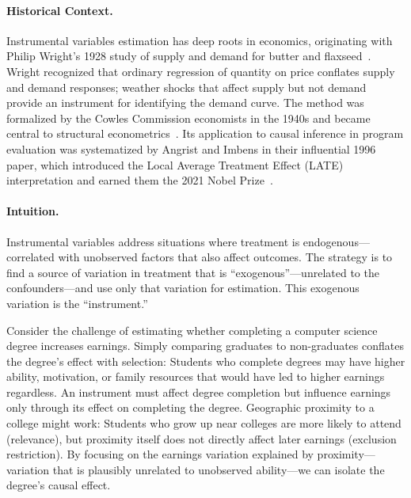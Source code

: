 \paragraph{Historical Context.}
Instrumental variables estimation has deep roots in economics, originating with Philip Wright's 1928 study of supply and demand for butter and flaxseed~\cite{wright1928tariff, stock2003retrospectives}.
Wright recognized that ordinary regression of quantity on price conflates supply and demand responses; weather shocks that affect supply but not demand provide an instrument for identifying the demand curve.
The method was formalized by the Cowles Commission economists in the 1940s and became central to structural econometrics~\cite{stock2003retrospectives}.
Its application to causal inference in program evaluation was systematized by Angrist and Imbens in their influential 1996 paper, which introduced the Local Average Treatment Effect (LATE) interpretation and earned them the 2021 Nobel Prize~\cite{angrist1996identification}.

\paragraph{Intuition.}
Instrumental variables address situations where treatment is endogenous---correlated with unobserved factors that also affect outcomes.
The strategy is to find a source of variation in treatment that is ``exogenous''---unrelated to the confounders---and use only that variation for estimation.
This exogenous variation is the ``instrument.''

Consider the challenge of estimating whether completing a computer science degree increases earnings.
Simply comparing graduates to non-graduates conflates the degree's effect with selection: Students who complete degrees may have higher ability, motivation, or family resources that would have led to higher earnings regardless.
An instrument must affect degree completion but influence earnings only through its effect on completing the degree.
Geographic proximity to a college might work: Students who grow up near colleges are more likely to attend (relevance), but proximity itself does not directly affect later earnings (exclusion restriction).
By focusing on the earnings variation explained by proximity---variation that is plausibly unrelated to unobserved ability---we can isolate the degree's causal effect.

